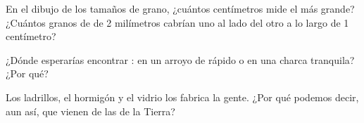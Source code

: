 \begin{exercise}[$\star\star$]\label{exo:g3:stones-pebbles-sand:8}
En el dibujo de los tamaños de grano, ¿cuántos centímetros mide el  más
grande? ¿Cuántos granos de  de 2 milímetros cabrían uno al lado del
otro a lo largo de 1 centímetro?
\end{exercise}

\begin{exercise}[$\star\star$]\label{exo:g3:stones-pebbles-sand:9}
¿Dónde esperarías encontrar : en un arroyo de  rápido o en una
charca tranquila? ¿Por qué?
\end{exercise}

\begin{exercise}[$\star\star$]\label{exo:g3:stones-pebbles-sand:10}
Los ladrillos, el hormigón y el vidrio los fabrica la gente. ¿Por qué
podemos decir, aun así, que vienen de las  de la Tierra?
\end{exercise}
